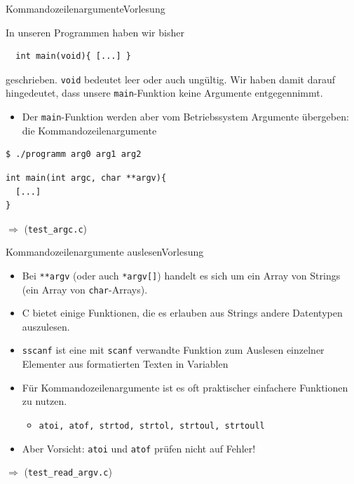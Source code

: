 \documentclass[xcolor=dvipsnames]{beamer}
\newcounter{lecturecounter}
\begin{document}
\begin{frame}[fragile]{Kommandozeilenargumente}{Vorlesung }
\begin{block}{}
  In unseren Programmen haben wir bisher
\end{block}
\begin{lstlisting}
  int main(void){ [...] } 
\end{lstlisting}
\begin{block}{}
  geschrieben. \texttt{void} bedeutet leer oder auch ungültig. Wir haben damit darauf hingedeutet, dass unsere \texttt{main}-Funktion keine Argumente entgegennimmt.
  \begin{itemize}
    \item{Der \texttt{main}-Funktion werden aber vom Betriebssystem Argumente übergeben: die Kommandozeilenargumente}
  \end{itemize}
\begin{verbatim}
$ ./programm arg0 arg1 arg2
\end{verbatim}
\begin{lstlisting}
int main(int argc, char **argv){
  [...]
}
\end{lstlisting}

\end{block}
$\Rightarrow$ (\texttt{test\_argc.c})
\end{frame}

\begin{frame}[fragile]{Kommandozeilenargumente auslesen}{Vorlesung }
  \begin{block}{}
    \begin{itemize}
      \item{Bei \texttt{**argv} (oder auch \texttt{*argv[]}) handelt es sich um ein Array von Strings (ein Array von \texttt{char}-Arrays).}
      \item{C bietet einige Funktionen, die es erlauben aus Strings andere Datentypen auszulesen.}
      \item{\texttt{sscanf} ist eine mit \texttt{scanf} verwandte Funktion zum Auslesen einzelner Elementer aus formatierten Texten in Variablen}
      \item{Für Kommandozeilenargumente ist es oft praktischer einfachere Funktionen zu nutzen.}
      \begin{itemize}
        \item{\verb|atoi, atof, strtod, strtol, strtoul, strtoull|}
      \end{itemize}
      \item{Aber Vorsicht: \verb|atoi| und \verb|atof| prüfen nicht auf Fehler!}
    \end{itemize}
  \end{block}
  $\Rightarrow$ (\verb|test_read_argv.c|)
\end{frame}
\end{document}
